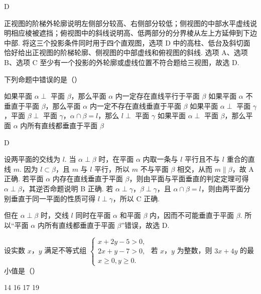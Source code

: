 \begin{answer}
D
\end{answer}

\begin{solution}
正视图的阶梯外轮廓说明左侧部分较高、右侧部分较低；侧视图的中部水平虚线说明相应棱被遮挡；俯视图中的斜线说明高、低两部分的分界棱从左上方延伸到下边中部. 将这三个投影条件同时用于四个直观图，选项 D 中的高柱、低台及斜切面恰好给出正视图的阶梯轮廓、侧视图的中部虚线和俯视图的斜线. 选项 A、选项 B、选项 C 至少有一个投影的外轮廓或虚线位置不符合题给三视图，故选 D.
\end{solution}

\begin{problem}
下列命题中错误的是（\quad）

\choices
    {如果平面 \(\alpha \perp\) 平面 \(\beta\)，那么平面 \(\alpha\) 内一定存在直线平行于平面 \(\beta\)}
    {如果平面 \( \alpha \) 不垂直于平面 \( \beta \)，那么平面 \( \alpha \) 内一定不存在直线垂直于平面 \( \beta \)}
    {如果平面 \(\alpha \perp\) 平面 \(\gamma\)，平面 \(\beta \perp\) 平面 \(\gamma\)，\(\alpha \cap \beta = l\)，那么 \(l \perp\) 平面 \(\gamma\)}
    {如果平面 \(\alpha \perp\) 平面 \(\beta\)，那么平面 \(\alpha\) 内所有直线都垂直于平面 \(\beta\)}
\end{problem}

\begin{answer}
D
\end{answer}

\begin{solution}
设两平面的交线为 \(l\). 当 \(\alpha\perp\beta\) 时，在平面 \(\alpha\) 内取一条与 \(l\) 平行且不与 \(l\) 重合的直线 \(m\). 因为 \(l\subset\beta\)，且 \(m\) 与 \(l\) 平行，所以 \(m\) 不与平面 \(\beta\) 相交，从而 \(m\parallel\beta\)，故 A 正确. 若平面 \(\alpha\) 内存在直线垂直于平面 \(\beta\)，则由平面与平面垂直的判定定理可得 \(\alpha\perp\beta\)，其逆否命题说明 B 正确. 若 \(\alpha\perp\gamma\)，\(\beta\perp\gamma\)，且 \(\alpha\cap\beta=l\)，则由两平面分别垂直于同一平面的性质可得 \(l\perp\gamma\)，所以 C 正确.

但在 \(\alpha\perp\beta\) 时，交线 \(l\) 同时在平面 \(\alpha\) 和平面 \(\beta\) 内，因而不可能垂直于平面 \(\beta\). 所以“平面 \(\alpha\) 内所有直线都垂直于平面 \(\beta\)”错误，故选 D.
\end{solution}

\begin{problem}
设实数 \(x\)，\(y\) 满足不等式组 \(\begin{cases}
x + 2y - 5 > 0,\\
2x + y - 7 > 0,\\
x \geqslant 0, y \geqslant 0.
\end{cases}\) 若 \(x\)，\(y\) 为整数，则 \(3x + 4y\) 的最小值是（\quad）

\choices
    {14}
    {16}
    {17}
    {19}
\end{problem}

